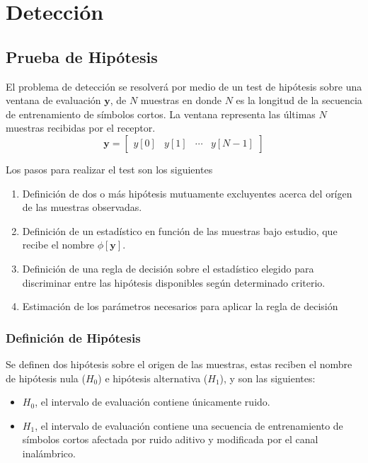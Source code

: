\chapter{Detección}
\label{Ch:4}
\graphicspath{{figs/}}

\section{Prueba de Hipótesis}
\label{S:prueba-hipotesis}

El problema de detección se resolverá por medio de un test de hipótesis sobre una ventana de evaluación $\mathbf{y}$, de $N$ muestras en donde $N$ es la longitud de la secuencia de entrenamiento de símbolos cortos. La ventana representa las últimas $N$ muestras recibidas por el receptor.
\begin{equation}\label{eq:def_y}
    \mathbf{y} = \begin{bmatrix}
        y[0] & y[1] & \cdots & y[N-1]
    \end{bmatrix}
\end{equation}

Los pasos para realizar el test son los siguientes
\begin{enumerate}
    \item Definición de dos o más hipótesis mutuamente excluyentes acerca del orígen de las muestras observadas.
    \item Definición de un estadístico en función de las muestras bajo estudio, que recibe el nombre $\phi\left[\mathbf{y}\right]$.
    \item Definición de una regla de decisión sobre el estadístico elegido para discriminar entre las hipótesis disponibles según determinado criterio. 
    \item Estimación de los parámetros necesarios para aplicar la regla de decisión
\end{enumerate}

\subsection{Definición de Hipótesis}
\label{Ss:def-hipotesis}

Se definen dos hipótesis sobre el origen de las muestras, estas reciben el nombre de hipótesis nula ($H_0$) e hipótesis alternativa ($H_1$), y son las siguientes:
\begin{itemize}
    \item $H_0$, el intervalo de evaluación contiene únicamente ruido.
    \item $H_1$, el intervalo de evaluación contiene una secuencia de entrenamiento de símbolos cortos afectada por ruido aditivo y modificada por el canal inalámbrico.
\end{itemize}

